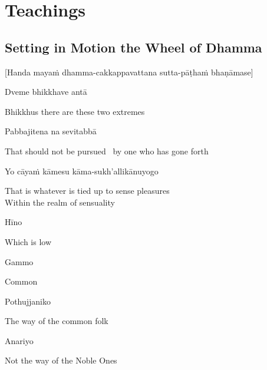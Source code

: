 
\chapter{Teachings}

\section{Setting in Motion the Wheel of Dhamma}
\label{wheel-of-dhamma-abridged}

\begin{center}
  [Handa mayaṁ dhamma-cakkappavattana sutta-pāṭhaṁ bhaṇāmase]
\end{center}

Dveme bhikkhave antā

\begin{english}
  Bhikkhus there are these two extremes
\end{english}

Pabbajitena na sevitabbā

\begin{english}
  That should not be pursued \breathmark\ by one who has gone forth
\end{english}

Yo cāyaṁ kāmesu kāma-sukh’allikānuyogo

\begin{english}
  That is whatever is tied up to sense pleasures\\
  Within the realm of sensuality
\end{english}

Hīno

\begin{english}
  Which is low
\end{english}

Gammo

\begin{english}
  Common
\end{english}

Pothujjaniko

\begin{english}
  The way of the common folk
\end{english}

Anariyo

\begin{english}
  Not the way of the Noble Ones
\end{english}

